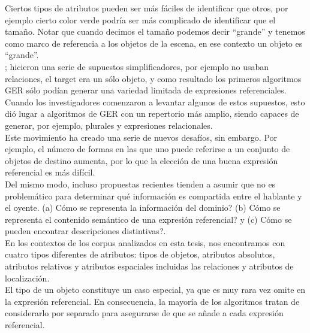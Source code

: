Ciertos tipos de atributos pueden ser m\'as f\'aciles de identificar que otros, por ejemplo cierto color verde podr\'{i}a ser m\'as complicado de identificar que el tama\~no. Notar que cuando decimos el tama\~no podemos decir ``grande'' y tenemos como marco de referencia a los objetos de la escena, en ese contexto un objeto es ``grande''.\\

\cite{C92-1038}; \cite{Dale95computationalinterpretations} hicieron una serie de supuestos simplificadores, por ejemplo no usaban relaciones, el target era un s\'olo objeto, y como resultado los primeros
algoritmos GER s\'olo pod\'ian generar una variedad limitada de expresiones referenciales. Cuando
los investigadores comenzaron a levantar algunos de estos supuestos, esto di\'o lugar a algoritmos de GER
con un repertorio m\'as amplio, siendo capaces de generar, por ejemplo, plurales y expresiones relacionales. \\

Este movimiento ha creado una serie de nuevos desaf\'ios, sin embargo. Por ejemplo, el
n\'umero de formas en las que uno puede referirse a un conjunto de objetos de destino aumenta, por lo que la elecci\'on de una
buena expresi\'on referencial es m\'as dif\'icil.\\

Del mismo modo, incluso propuestas recientes tienden a asumir que no es problem\'atico para determinar qu\'e informaci\'on
es compartida entre el hablante y el oyente.
 (a) C\'omo se representa la informaci\'on del dominio?
(b) C\'omo se representa el contenido sem\'antico de una expresi\'on referencial? y (c) C\'omo se pueden encontrar descripciones distintivas?.\\

 En los contextos de los corpus analizados en esta tesis, nos encontramos con cuatro tipos diferentes de atributos:
tipos de objetos, atributos absolutos, atributos relativos y atributos espaciales incluidas las relaciones y atributos de localizaci\'on.\\

El tipo de un objeto constituye un caso especial, ya que es muy rara vez omite
en la expresi\'on referencial. En consecuencia, la mayor\'ia de los algoritmos tratan de
considerarlo por separado para asegurarse de que se a\~nade a cada expresi\'on referencial. \\

